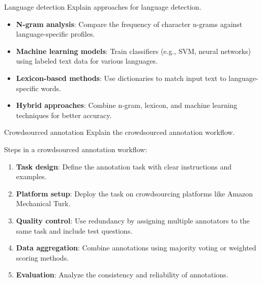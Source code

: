 \documentclass{article}
\begin{document}
\begin{exercise}{Language detection}
  Explain approaches for language detection.

  \begin{solution}
    \begin{itemize}
        \item \textbf{N-gram analysis}: Compare the frequency of character n-grams against language-specific profiles.
        \item \textbf{Machine learning models}: Train classifiers (e.g., SVM, neural networks) using labeled text data for various languages.
        \item \textbf{Lexicon-based methods}: Use dictionaries to match input text to language-specific words.
        \item \textbf{Hybrid approaches}: Combine n-gram, lexicon, and machine learning techniques for better accuracy.
    \end{itemize}
  \end{solution}
\end{exercise}

\begin{exercise}{Crowdsourced annotation}
  Explain the crowdsourced annotation workflow.

  \begin{solution}
    Steps in a crowdsourced annotation workflow:
    \begin{enumerate}
        \item \textbf{Task design}: Define the annotation task with clear instructions and examples.
        \item \textbf{Platform setup}: Deploy the task on crowdsourcing platforms like Amazon Mechanical Turk.
        \item \textbf{Quality control}: Use redundancy by assigning multiple annotators to the same task and include test questions.
        \item \textbf{Data aggregation}: Combine annotations using majority voting or weighted scoring methods.
        \item \textbf{Evaluation}: Analyze the consistency and reliability of annotations.
    \end{enumerate}
  \end{solution}
\end{exercise}
\end{document}
